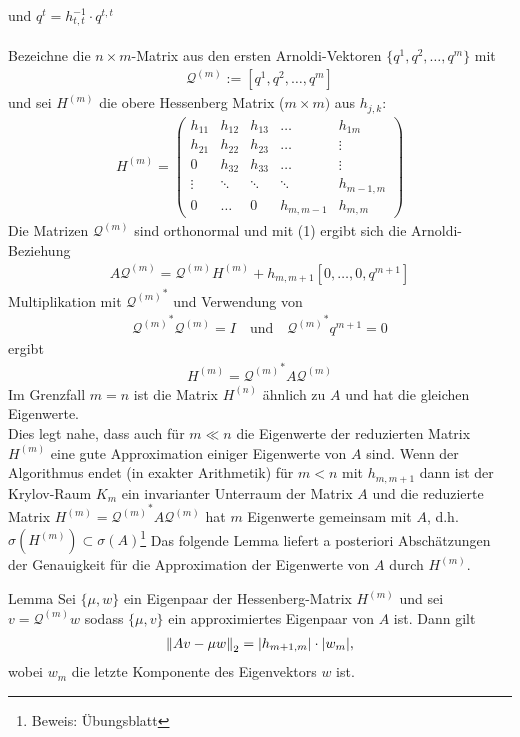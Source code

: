 und $q^t = h_{t,t}^{-1}\cdot q^{t,t}$ \\ \\
Bezeichne die $n\times m$-Matrix aus den ersten Arnoldi-Vektoren $\{q^1,q^2,\dotsc,q^m\}$ mit 
\begin{align*}\mathcal{Q}^{(m)}:=[q^1,q^2,\dotsc,q^m]\end{align*} und sei $H^{(m)}$ die obere Hessenberg Matrix ($m\times m)$ aus $h_{j,k}$:
\begin{align*}H^{(m)} = \begin{pmatrix}
  h_{11} & h_{12} & h_{13} & \dotsc & h_{1m} \\
  h_{21} & h_{22} & h_{23} & \dotsc & \vdots \\
  0 & h_{32} & h_{33} & \dotsc & \vdots \\
  \vdots & \ddots &  \ddots &   \ddots &  h_{m-1,m} \\
  0 &\dotsc & 0 & h_{m,m-1} & h_{m,m}
\end{pmatrix}\end{align*}
Die Matrizen $\mathcal{Q}^{(m)}$ sind orthonormal und mit (1) ergibt sich die Arnoldi-Beziehung 
\begin{align*}A\mathcal{Q}^{(m)} = \mathcal{Q}^{(m)} H^{(m)} + h_{m,m+1}[0,\dotsc,0,q^{m+1}]\tag{3}\end{align*}
Multiplikation mit ${\mathcal{Q}^{(m)}}^*$  und Verwendung von 
\begin{align*}{\mathcal{Q}^{(m)}}^* \mathcal{Q}^{(m)} = I \quad \text{und}\quad {\mathcal{Q}^{(m)}}^* q^{m+1}=0\end{align*}
ergibt 
\begin{align*}H^{(m)} = {\mathcal{Q}^{(m)}}^* A \mathcal{Q}^{(m)}\end{align*}
Im Grenzfall $m=n$ ist die Matrix $H^{(n)}$ ähnlich zu $A$ und hat die gleichen Eigenwerte. \\
Dies legt nahe, dass auch für $m\ll n$ die Eigenwerte der reduzierten Matrix $H^{(m)}$ eine gute Approximation 
einiger Eigenwerte von $A$ sind. Wenn der Algorithmus endet (in exakter Arithmetik) für $m<n$ mit $h_{m,m+1}$ dann
ist der Krylov-Raum $K_m$ ein invarianter Unterraum der Matrix $A$ und die reduzierte Matrix $H^{(m)} = 
{\mathcal{Q}^{(m)}}^* A \mathcal{Q}^{(m)}$ hat $m$ Eigenwerte gemeinsam mit $A$, d.h. $\sigma(H^{(m)})\subset \sigma(A)$\footnote{Beweis: Übungsblatt}
Das folgende Lemma liefert a posteriori Abschätzungen der Genauigkeit für die Approximation der Eigenwerte von $A$ durch 
$H^{(m)}$.
\begin{thmbox}{Lemma}
  Sei $\{\mu,w\}$ ein Eigenpaar der Hessenberg-Matrix $H^{(m)}$ und sei $v=\mathcal{Q}^{(m)}w$ sodass $\{\mu,v\}$ ein 
  approximiertes Eigenpaar von $A$ ist. Dann gilt
  \begin{align*}\vertn{2}{Av-\mu w}_2 = |h_{m+1,m}|\cdot |w_m|,\end{align*} 
  wobei $w_m$ die letzte Komponente des Eigenvektors $w$ ist.
\end{thmbox}
